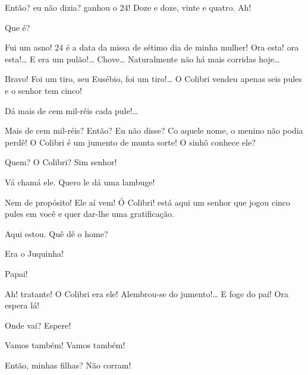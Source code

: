   Então? eu não dizia? ganhou o 24! Doze
e doze, vinte e quatro.  Ah!

 Que é?

 Fui um asno! 24 é a data da missa de sétimo dia de minha 
mulher!  Ora esta! ora esta!\ldots{} E era um pulão!\ldots{} 
 Chove\ldots{} Naturalmente não há mais corridas hoje\ldots{}

 Bravo! Foi um tiro, seu Eusébio, foi um tiro!\ldots{} O Colibri
vendeu apenas seis pules e o senhor tem cinco!

  Dá mais de cem mil-réis cada pule!\ldots{}

 Mais de cem mil-réis? Então? Eu não disse? Co aquele nome, o
menino não podia perdê! O Colibri é um jumento de munta sorte!  O sinhô conhece ele?

 Quem? O Colibri? Sim senhor!

 Vá chamá ele. Quero le dá uma lambuge!

 Nem de propósito! Ele aí vem!  Ó Colibri! está aqui um senhor que jogou cinco pules em você e quer dar-lhe
uma gratificação.

  Aqui estou. Quê dê o home?

 Era o Juquinha!

 Papai! 

 Ah! tratante! O Colibri era ele! Alembrou-se do jumento!\ldots{} E
foge do pai! Ora espera lá! 

 Onde vai? Espere! 

 Vamos também! Vamos também! 

 Então, minhas filhas? Não corram! 

